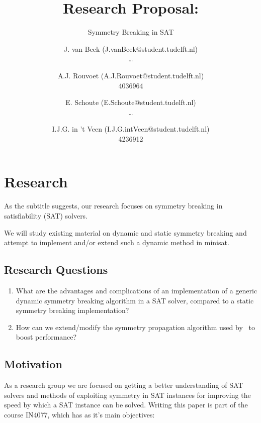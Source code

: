 

	\title{Research Proposal:}
	\author{
		J. van Beek (J.vanBeek@student.tudelft.nl) \\ \ldots \and
		A.J. Rouvoet (A.J.Rouvoet@student.tudelft.nl) \\ 4036964 \and
		E. Schoute (E.Schoute@student.tudelft.nl) \\ \ldots \and
		I.J.G. in 't Veen (I.J.G.intVeen@student.tudelft.nl) \\ 4236912
	}

	\subtitle{Symmetry Breaking in SAT}



	\maketitle
	\newpage

	\section{Research}
	As the subtitle suggests, our research focuses on symmetry breaking in satisfiability (SAT) solvers.

	We will study existing material on dynamic and static symmetry breaking and attempt to implement and/or extend such a dynamic method in minisat.

		\subsection{Research Questions}
		\begin{enumerate}
		\item What are the advantages and complications of an implementation of a generic dynamic	symmetry breaking algorithm in a SAT solver, compared to a static symmetry breaking implementation?
		\item How can we extend/modify the symmetry propagation algorithm used by~\cite{devriendt2012symmetry} to boost performance?
		\end{enumerate}

		\subsection{Motivation}
			As a research group we are focused on getting a better understanding of SAT solvers and methods of exploiting symmetry in SAT instances for improving the speed by which a SAT	instance can be solved.	Writing this paper is part of the course IN4077, which has as it's main objectives:

